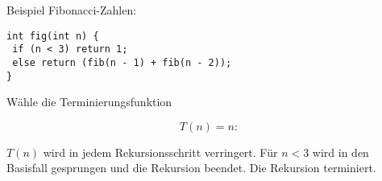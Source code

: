 \documentclass{lehramt-informatik-haupt}
\begin{document}
Beispiel Fibonacci-Zahlen:

\begin{verbatim}
int fig(int n) {
 if (n < 3) return 1;
 else return (fib(n - 1) + fib(n - 2));
}
\end{verbatim}
Wähle die Terminierungsfunktion

\begin{displaymath}
T(n) = n:
\end{displaymath}

$T(n)$ wird in jedem Rekursionsschritt verringert. Für $n < 3$ wird in
den Basisfall gesprungen und die Rekursion beendet. Die Rekursion
terminiert.

\literatur
\end{document}
